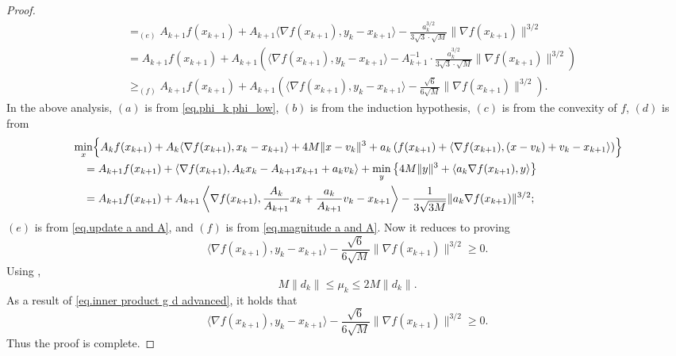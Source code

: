 \documentclass{article}
\begin{document}
\begin{proof}
\begin{align*}
         & =_{(e)} A_{k+1} f(x_{k+1}) + A_{k+1} \langle \nabla f(x_{k+1}), y_k - x_{k+1} \rangle
        - \frac{a_k^{3/2}}{3\sqrt{3} \cdot \sqrt{M}} \|\nabla f(x_{k+1})\|^{3/2}                                                                                                                                                       \\
         & = A_{k+1} f(x_{k+1}) + A_{k+1} \left(
        \langle \nabla f(x_{k+1}), y_k - x_{k+1} \rangle
        - A_{k+1}^{-1} \cdot \frac{a_k^{3/2}}{3\sqrt{3} \cdot \sqrt{M}}
        \|\nabla f(x_{k+1})\|^{3/2} \right)                                                                                                                                                                                            \\
         & \geq_{(f)} A_{k+1} f(x_{k+1}) + A_{k+1} \left(
        \langle \nabla f(x_{k+1}), y_k - x_{k+1} \rangle
        - \frac{\sqrt{6}}{6\sqrt{M}} \|\nabla f(x_{k+1})\|^{3/2} \right).
    \end{align*}
    In the above analysis, $(a)$ is from \eqref{eq.phi_k phi_low}, $(b)$ is from the induction hypothesis, $(c)$ is from the convexity of $f$, $(d)$ is from
    \begin{equation*}
        \begin{aligned}
             & \min_{x} \Bigl\{ A_k f(x_{k+1}) + A_k \langle \nabla f(x_{k+1}), x_k - x_{k+1} \rangle + 4M \|x - v_k\|^3 + a_k \left(f(x_{k+1}) + \langle \nabla f(x_{k+1}), (x - v_k) + v_k - x_{k+1} \rangle \right) \Bigr\} \\
             & \quad = A_{k+1} f(x_{k+1}) + \left\langle \nabla f(x_{k+1}), A_k x_k - A_{k+1} x_{k+1} + a_k v_k \right\rangle + \min_{y} \left\{ 4M \|y\|^3 + \langle a_k \nabla f(x_{k+1}), y \rangle \right\}                \\
             & \quad = A_{k+1} f(x_{k+1}) + A_{k+1} \left\langle \nabla f(x_{k+1}), \frac{A_k}{A_{k+1}} x_k + \frac{a_k}{A_{k+1}} v_k - x_{k+1} \right\rangle - \frac{1}{3\sqrt{3M}} \|a_k \nabla f(x_{k+1})\|^{3/2};
        \end{aligned}
    \end{equation*}
    $(e)$ is from \eqref{eq.update a and A}, and $(f)$ is from \eqref{eq.magnitude a and A}. Now it reduces to proving
    \begin{equation*}
        \langle \nabla f(x_{k+1}),y_k-x_{k+1} \rangle -\frac{\sqrt{6}}{6\sqrt{M}}\|\nabla f(x_{k+1})\|^{3/2} \geq 0.
    \end{equation*}
    Using ,
    \begin{equation*}
        M\|d_k\| \leq \mu_k \leq 2M\|d_k\|.
    \end{equation*}
    As a result of \eqref{eq.inner product g d advanced}, it holds that
    \begin{equation*}
        \langle \nabla f(x_{k+1}),y_k-x_{k+1} \rangle -\frac{\sqrt{6}}{6\sqrt{M}}\|\nabla f(x_{k+1})\|^{3/2} \geq 0.
    \end{equation*}
    Thus the proof is complete.
\end{proof}
\end{document}
